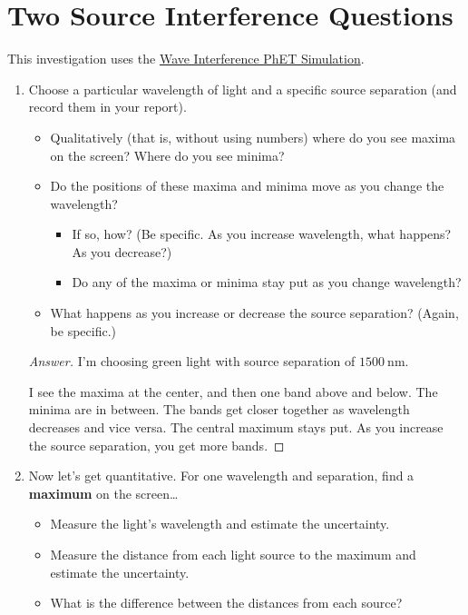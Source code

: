 \documentclass{article}
\begin{document}
\section{Two Source Interference Questions}
This investigation uses the \href{https://phet.colorado.edu/sims/html/wave-interference/latest/wave-interference_en.html}{Wave Interference PhET Simulation}.
\begin{enumerate}
    \item Choose a particular wavelength of light and a specific source separation (and record them in your report).
    \begin{itemize}
        \item Qualitatively (that is, without using numbers) where do you see maxima on the screen? Where do you see minima?
        \item Do the positions of these maxima and minima move as you change the wavelength?
        \begin{itemize}
            \item If so, how? (Be specific. As you increase wavelength, what happens? As you decrease?)
            \item Do any of the maxima or minima stay put as you change wavelength?
        \end{itemize}
        \item What happens as you increase or decrease the source separation? (Again, be specific.)        
    \end{itemize}
    \begin{proof}[Answer]
        I'm choosing green light with source separation of $\SI{1500}{\nano\meter}$.\par
        I see the maxima at the center, and then one band above and below. The minima are in between. The bands get closer together as wavelength decreases and vice versa. The central maximum stays put. As you increase the source separation, you get more bands.
    \end{proof}
    \item Now let's get quantitative. For one wavelength and separation, find a \textbf{maximum} on the screen\dots
    \begin{itemize}
        \item Measure the light's wavelength and estimate the uncertainty.
        \item Measure the distance from each light source to the maximum and estimate the uncertainty.
        \item What is the difference between the distances from each source?

\end{itemize}
\end{enumerate}
\end{document}
